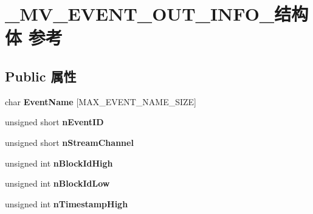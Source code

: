 \hypertarget{struct___m_v___e_v_e_n_t___o_u_t___i_n_f_o__}{}\section{\+\_\+\+M\+V\+\_\+\+E\+V\+E\+N\+T\+\_\+\+O\+U\+T\+\_\+\+I\+N\+F\+O\+\_\+结构体 参考}
\label{struct___m_v___e_v_e_n_t___o_u_t___i_n_f_o__}
\subsection*{Public 属性}
\begin{DoxyCompactItemize}
\item 
\mbox{\label{struct___m_v___e_v_e_n_t___o_u_t___i_n_f_o___ab9331564c7173f119d43d6e642545e32}} 
char {\bfseries Event\+Name} \mbox{[}M\+A\+X\+\_\+\+E\+V\+E\+N\+T\+\_\+\+N\+A\+M\+E\+\_\+\+S\+I\+ZE\mbox{]}
\item 
\mbox{\label{struct___m_v___e_v_e_n_t___o_u_t___i_n_f_o___a4b347539d0012658609bbf52be52a264}} 
unsigned short {\bfseries n\+Event\+ID}
\item 
\mbox{\label{struct___m_v___e_v_e_n_t___o_u_t___i_n_f_o___ac0242ad71413b3399bf87e8036b44833}} 
unsigned short {\bfseries n\+Stream\+Channel}
\item 
\mbox{\label{struct___m_v___e_v_e_n_t___o_u_t___i_n_f_o___aa6cfda658b833cd559115e9aa46d25e6}} 
unsigned int {\bfseries n\+Block\+Id\+High}
\item 
\mbox{\label{struct___m_v___e_v_e_n_t___o_u_t___i_n_f_o___a02cc706a80150715d80bc9d47487dc52}} 
unsigned int {\bfseries n\+Block\+Id\+Low}
\item 
\mbox{\label{struct___m_v___e_v_e_n_t___o_u_t___i_n_f_o___a072353736aa4c9b75ea2b9434f025bdb}} 
unsigned int {\bfseries n\+Timestamp\+High}
\item 
\mbox{\label{struct___m_v___e_v_e_n_t___o_u_t___i_n_f_o___a60774b3ce769c713ce18bcff7d64f1cc}} 

\end{DoxyCompactItemize}
